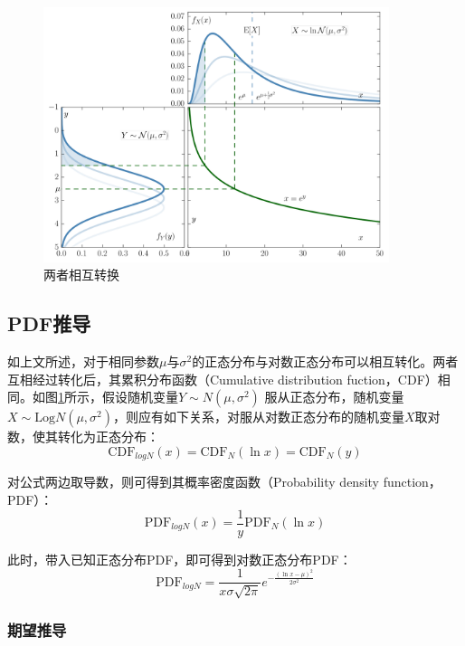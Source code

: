 \documentclass[11pt]{article}
\begin{document}
\begin{figure}[H]
    \centering
    \includegraphics[width=0.9\textwidth]{fig/lognormal-distribution.png}
    \caption{两者相互转换}
    \label{fig:lognormal}
\end{figure}

\subsection{PDF推导}

如上文所述，对于相同参数$\mu$与$\sigma^2$的正态分布与对数正态分布可以相互转化。两者互相经过转化后，其累积分布函数（Cumulative distribution fuction，CDF）相同。如图\ref{fig:lognormal}所示，假设随机变量$Y \sim N(\mu,\sigma^2)$ 服从正态分布，随机变量$X \sim \text{Log}N(\mu,\sigma^2)$，则应有如下关系，对服从对数正态分布的随机变量$X$取对数，使其转化为正态分布：
\begin{equation*}
    \text{CDF}_{logN}(x) = \text{CDF}_N (\ln x) = \text{CDF}_N (y)
\end{equation*}

对公式两边取导数，则可得到其概率密度函数（Probability density function，PDF）：
\begin{equation*}
    \text{PDF}_{logN}(x) = \frac{1}{y} \text{PDF}_N(\ln x)
\end{equation*}

此时，带入已知正态分布PDF，即可得到对数正态分布PDF：
\begin{equation*}
    \text{PDF}_{logN} = \frac{1}{x\sigma\sqrt{2\pi}} e^{-\frac{(\ln x - \mu)^2}{2\sigma^2}}
\end{equation*}

\subsubsection{期望推导}
\end{document}
